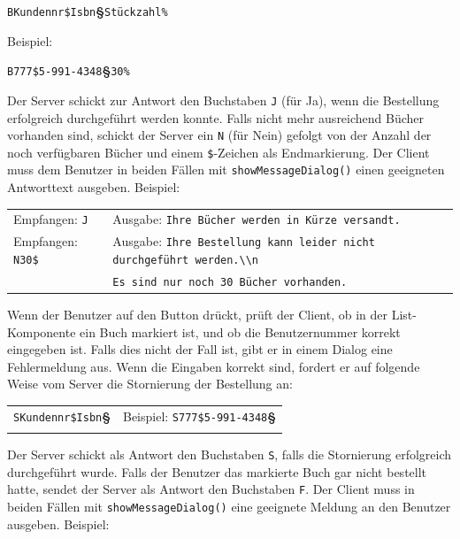 \lstinline|BKundennr$Isbn|\textbf{§}\lstinline|Stückzahl%|

Beispiel: 

\lstinline|B777$5-991-4348|\textbf{§}\lstinline|30%|

Der Server schickt zur Antwort den Buchstaben \lstinline|J| (für Ja), wenn die
Bestellung erfolgreich durchgeführt werden konnte. Falls nicht mehr ausreichend
Bücher vorhanden sind, schickt der Server ein \lstinline|N| (für Nein) gefolgt
von der Anzahl der noch verfügbaren Bücher und einem \lstinline|$|-Zeichen als
Endmarkierung. Der Client muss dem Benutzer in beiden Fällen mit
\lstinline|showMessageDialog()| einen geeigneten Antworttext ausgeben. Beispiel:

\bgroup
\def\arraystretch{1.2}
\begin{tabularx}{\textwidth}{p{30mm} X}
Empfangen: \lstinline|J| &
Ausgabe: \lstinline|Ihre Bücher werden in Kürze versandt.| \\
Empfangen: \lstinline|N30$| &
Ausgabe: \lstinline|Ihre Bestellung kann leider nicht durchgeführt werden.\\n|
\\
& \hspace{15mm}\lstinline|Es sind nur noch 30 Bücher vorhanden.|
\\
\end{tabularx}
\egroup

Wenn der Benutzer auf den Button  drückt, prüft der Client, ob in der List-Komponente ein Buch
markiert ist, und ob die Benutzernummer korrekt eingegeben ist. Falls dies
nicht der Fall ist, gibt er in einem Dialog eine Fehlermeldung aus. Wenn die
Eingaben korrekt sind, fordert er auf folgende Weise vom Server die Stornierung
der Bestellung an:

\bgroup
\def\arraystretch{1.2}
\begin{tabularx}{\textwidth}{p{30mm} X}
\lstinline|SKundennr$Isbn|\textbf{§} &
Beispiel: \lstinline|S777$5-991-4348|\textbf{§} \\
\\
\end{tabularx}
\egroup

Der Server schickt als Antwort den Buchstaben \lstinline|S|, falls die
Stornierung erfolgreich durchgeführt wurde. Falls der Benutzer das markierte
Buch gar nicht bestellt hatte, sendet der Server als Antwort den Buchstaben
\lstinline|F|. Der Client muss in beiden Fällen mit
\lstinline|showMessageDialog()| eine geeignete Meldung an den Benutzer ausgeben.
Beispiel:

